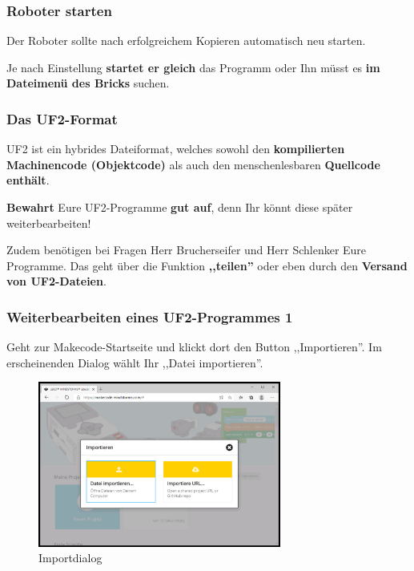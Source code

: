 \documentclass{beamer}
\begin{document}
\begin{frame}
\frametitle{Roboter starten}

Der Roboter sollte nach erfolgreichem Kopieren automatisch neu starten. 

Je nach Einstellung \textbf{startet er gleich} das Programm oder Ihn müsst es \textbf{im Dateimenü des Bricks} suchen. 

\end{frame}

\begin{frame}
\frametitle{Das UF2-Format}

UF2 ist ein hybrides Dateiformat, welches sowohl den \textbf{kompilierten Machinencode (Objektcode)} als auch den menschenlesbaren \textbf{Quellcode enthält}.

\textbf{Bewahrt} Eure UF2-Programme \textbf{gut auf}, denn Ihr könnt diese später weiterbearbeiten! 

Zudem benötigen bei Fragen Herr Brucherseifer und Herr Schlenker Eure Programme. Das geht über die Funktion \textbf{,,teilen''} oder eben durch den \textbf{Versand von UF2-Dateien}.

\end{frame}

\begin{frame}
\frametitle{Weiterbearbeiten eines UF2-Programmes 1}

Geht zur Makecode-Startseite und klickt dort den Button ,,Importieren''. Im erscheinenden Dialog wählt Ihr ,,Datei importieren''.

\begin{figure}
  \includegraphics[width=8cm]{mkcd03.png}
  \caption{Importdialog}
  \label{fig:mkcd3}
\end{figure}
\end{frame}
\end{document}
